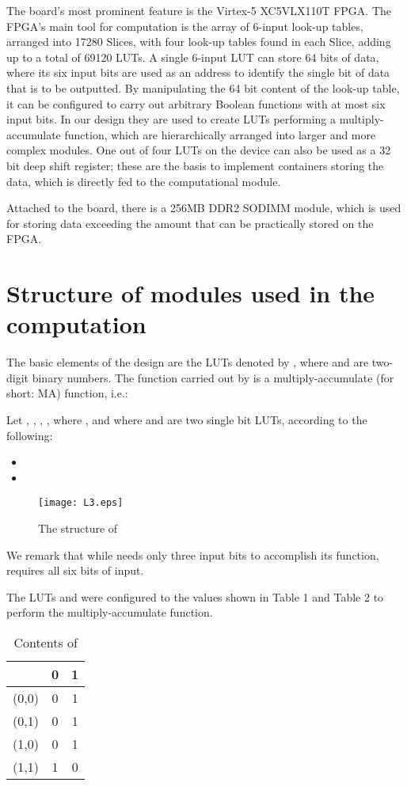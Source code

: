 \documentclass[11pt,twoside]{article}
\begin{document}
The board's most prominent feature is the Virtex-5 XC5VLX110T FPGA. The FPGA's main tool for computation is the array of 6-input look-up tables, arranged into 17280 Slices, with four look-up tables found in each Slice, adding up to a total of 69120 LUTs. A single 6-input LUT can store 64 bits of data, where its six input bits are used as an address to identify the single bit of data that is to be outputted. By manipulating the 64 bit content of the look-up table, it can be configured to carry out arbitrary Boolean functions with at most six input bits. In our design they are used to create LUTs performing a multiply-accumulate function, which are hierarchically arranged into larger and more complex modules. One out of four LUTs on the device can also be used as a 32 bit deep shift register; these are the basis to implement containers storing the data, which is directly fed to the computational module.

Attached to the board, there is a 256MB DDR2 SODIMM module, which is used for storing data exceeding the amount that can be practically stored on the FPGA.

\section{Structure of modules used in the computation}

The basic elements of the design are the LUTs denoted by , where  and  are two-digit binary numbers. The function carried out by  is a multiply-accumulate (for short: MA) function, i.e.:

Let , , , , where  , and  where  and  are two single bit LUTs, according to the following:
\\
\begin{itemize}
\item 
\item 
\end{itemize}
\begin{figure}[h!]
\centering
\texttt{[image: L3.eps]}
\caption{The structure of }
\end{figure}

We remark that while  needs only three input bits to accomplish its function,  requires all six bits of input.

The LUTs  and  were configured to the values shown in Table 1 and Table 2 to perform the multiply-accumulate function.

\begin{table}[h!]
\centering
\begin{tabular} { | c | c | c |}
\hline
\backslashbox{()}{} & 0 & 1 \\ \hline
(0,0) & 0 & 1 \\ \hline
(0,1) & 0 & 1 \\ \hline
(1,0) & 0 & 1 \\ \hline
(1,1) & 1 & 0 \\ \hline
\end{tabular}
\caption{Contents of }
\end{table}
\end{document}
